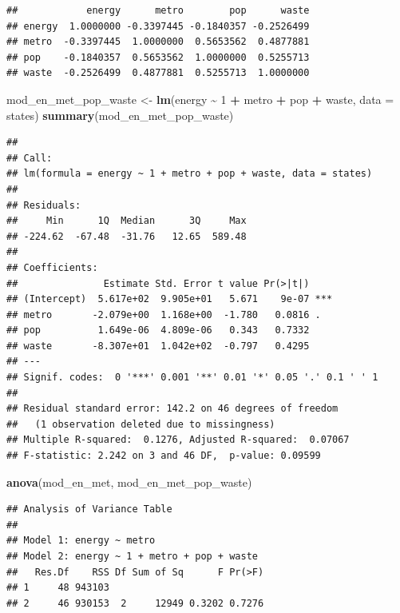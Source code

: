 \documentclass[
]{book}
\newenvironment{Shaded}{\begin{snugshade}}{\end{snugshade}}
\newcommand{\DataTypeTok}[1]{\textcolor[rgb]{0.13,0.29,0.53}{#1}}
\newcommand{\DecValTok}[1]{\textcolor[rgb]{0.00,0.00,0.81}{#1}}
\newcommand{\KeywordTok}[1]{\textcolor[rgb]{0.13,0.29,0.53}{\textbf{#1}}}
\newcommand{\NormalTok}[1]{#1}
\newcommand{\OperatorTok}[1]{\textcolor[rgb]{0.81,0.36,0.00}{\textbf{#1}}}
\newcommand{\StringTok}[1]{\textcolor[rgb]{0.31,0.60,0.02}{#1}}
\begin{document}
\begin{alert}
\begin{verbatim}
##            energy      metro        pop      waste
## energy  1.0000000 -0.3397445 -0.1840357 -0.2526499
## metro  -0.3397445  1.0000000  0.5653562  0.4877881
## pop    -0.1840357  0.5653562  1.0000000  0.5255713
## waste  -0.2526499  0.4877881  0.5255713  1.0000000
\end{verbatim}

\begin{Shaded}
\begin{Highlighting}[]
\NormalTok{  mod\_en\_met\_pop\_waste \textless{}{-}}\StringTok{ }\KeywordTok{lm}\NormalTok{(energy }\OperatorTok{\textasciitilde{}}\StringTok{ }\DecValTok{1} \OperatorTok{+}\StringTok{ }\NormalTok{metro }\OperatorTok{+}\StringTok{ }\NormalTok{pop }\OperatorTok{+}\StringTok{ }\NormalTok{waste, }\DataTypeTok{data =}\NormalTok{ states)}
  \KeywordTok{summary}\NormalTok{(mod\_en\_met\_pop\_waste)}
\end{Highlighting}
\end{Shaded}

\begin{verbatim}
## 
## Call:
## lm(formula = energy ~ 1 + metro + pop + waste, data = states)
## 
## Residuals:
##     Min      1Q  Median      3Q     Max 
## -224.62  -67.48  -31.76   12.65  589.48 
## 
## Coefficients:
##               Estimate Std. Error t value Pr(>|t|)    
## (Intercept)  5.617e+02  9.905e+01   5.671    9e-07 ***
## metro       -2.079e+00  1.168e+00  -1.780   0.0816 .  
## pop          1.649e-06  4.809e-06   0.343   0.7332    
## waste       -8.307e+01  1.042e+02  -0.797   0.4295    
## ---
## Signif. codes:  0 '***' 0.001 '**' 0.01 '*' 0.05 '.' 0.1 ' ' 1
## 
## Residual standard error: 142.2 on 46 degrees of freedom
##   (1 observation deleted due to missingness)
## Multiple R-squared:  0.1276, Adjusted R-squared:  0.07067 
## F-statistic: 2.242 on 3 and 46 DF,  p-value: 0.09599
\end{verbatim}

\begin{Shaded}
\begin{Highlighting}[]
  \KeywordTok{anova}\NormalTok{(mod\_en\_met, mod\_en\_met\_pop\_waste)}
\end{Highlighting}
\end{Shaded}

\begin{verbatim}
## Analysis of Variance Table
## 
## Model 1: energy ~ metro
## Model 2: energy ~ 1 + metro + pop + waste
##   Res.Df    RSS Df Sum of Sq      F Pr(>F)
## 1     48 943103                           
## 2     46 930153  2     12949 0.3202 0.7276
\end{verbatim}

\end{alert}
\end{document}
